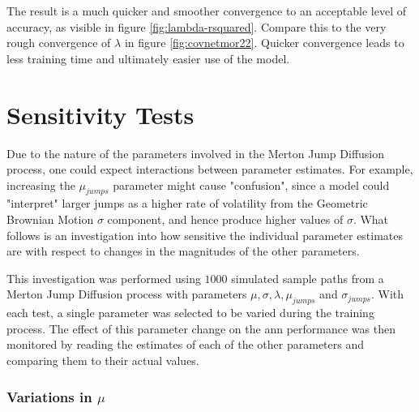 \documentclass[11pt,oneside,openany,a4paper,english, report, goldenblock
]{usthesis}
\begin{document}
The result is a much quicker and smoother convergence to an acceptable level of accuracy, as visible in figure \ref{fig:lambda-rsquared}. Compare this to the very rough convergence of $\lambda$ in figure \ref{fig:covnetmor22}. Quicker convergence leads to less training time and ultimately easier use of the model.

\section{Sensitivity Tests}
Due to the nature of the parameters involved in the Merton Jump Diffusion process, one could expect interactions between parameter estimates. For example, increasing the $\mu_{jumps}$ parameter might cause "confusion", since a model could "interpret" larger jumps as a higher rate of volatility from the Geometric Brownian Motion $\sigma$ component, and hence produce higher values of $\sigma$. What follows is an investigation into how sensitive the individual parameter estimates are with respect to changes in the magnitudes of the other parameters. 

This investigation was performed using $1000$ simulated sample paths from a Merton Jump Diffusion process with parameters $\mu, \sigma, \lambda, \mu_{jumps}$ and $\sigma_{jumps}$. With each test, a single parameter was selected to be varied during the training process. The effect of this parameter change on the \acrshort{ann} performance was then monitored by reading the estimates of each of the other parameters and comparing them to their actual values.

\subsubsection{Variations in $\mu$}
\end{document}
